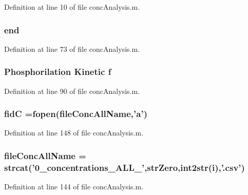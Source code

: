 Definition at line 10 of file conc\+Analysis.\+m.

\hypertarget{a00025_afb358f48b1646c750fb9da6c6585be2b}{
\subsubsection[{end}]{\setlength{\rightskip}{0pt plus 5cm}end}}\label{a00025_afb358f48b1646c750fb9da6c6585be2b}


Definition at line 73 of file conc\+Analysis.\+m.

\hypertarget{a00025_a9c5a71c46b1abb8b7df5ebeac6c81535}{
\subsubsection[{f}]{\setlength{\rightskip}{0pt plus 5cm}Phosphorilation Kinetic f}}\label{a00025_a9c5a71c46b1abb8b7df5ebeac6c81535}


Definition at line 90 of file conc\+Analysis.\+m.

\hypertarget{a00025_a5650dbe23ad9065391c1ea56f8acd34c}{
\subsubsection[{fid\+C}]{\setlength{\rightskip}{0pt plus 5cm}fid\+C =fopen({\bf file\+Conc\+All\+Name},'{\bf a}')}}\label{a00025_a5650dbe23ad9065391c1ea56f8acd34c}


Definition at line 148 of file conc\+Analysis.\+m.

\hypertarget{a00025_a45b397c4e1bd8e68da97ba6d26fbb41f}{
\subsubsection[{file\+Conc\+All\+Name}]{\setlength{\rightskip}{0pt plus 5cm}file\+Conc\+All\+Name = strcat('0\+\_\+concentrations\+\_\+\+A\+L\+L\+\_\+',str\+Zero,int2str(i),'.\+csv')}}\label{a00025_a45b397c4e1bd8e68da97ba6d26fbb41f}


Definition at line 144 of file conc\+Analysis.\+m.

